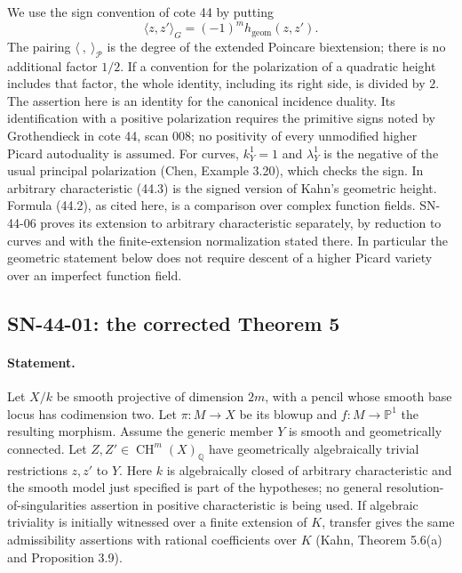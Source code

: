 \documentclass[11pt,a4paper]{article}
\theoremstyle{definition}
\theoremstyle{remark}
\begin{document}
We use the sign convention of cote 44 by putting
\[
 \langle z,z'\rangle_G=(-1)^m h_{\mathrm{geom}}(z,z').
 \tag{44.3}\label{eq:44-signed-height}
\]
The pairing $\langle\ ,\ \rangle_{\mathcal P}$ is the degree of the
extended Poincare biextension; there is no additional factor $1/2$.
If a convention for the polarization of a quadratic height includes
that factor, the whole identity, including its right side, is divided
by $2$.  The assertion here is an identity for the canonical incidence
duality.  Its identification with a positive polarization requires the
primitive signs noted by Grothendieck in cote 44, scan 008; no
positivity of every unmodified higher Picard autoduality is assumed.
For curves, $k_Y^1=1$ and $\lambda_Y^1$ is the negative of the usual
principal polarization (Chen, Example 3.20), which checks the sign.
In arbitrary characteristic (44.3) is the signed version of Kahn's
geometric height.  Formula (44.2), as cited here, is a comparison
over complex function fields.  SN-44-06 proves its extension to
arbitrary characteristic separately, by reduction to curves and
with the finite-extension normalization stated there.  In particular
the geometric statement below does not require descent of a higher
Picard variety over an imperfect function field.

\subsection{SN-44-01: the corrected Theorem 5}
\label{sn:44-01}

\paragraph{Statement.}
Let $X/k$ be smooth projective of dimension $2m$, with a pencil
whose smooth base locus has codimension two.  Let
$\pi:M\to X$ be its blowup and $f:M\to\mathbb P^1$ the resulting
morphism.  Assume the generic member $Y$ is smooth and geometrically
connected.  Let $Z,Z'\in\operatorname{CH}^{m}(X)_{\mathbb Q}$ have
geometrically algebraically trivial restrictions $z,z'$ to $Y$.
Here $k$ is algebraically closed of arbitrary characteristic and the
smooth model just specified is part of the hypotheses; no general
resolution-of-singularities assertion in positive characteristic is
being used.  If algebraic triviality is initially witnessed over a
finite extension of $K$, transfer gives the same admissibility
assertions with rational coefficients over $K$ (Kahn, Theorem 5.6(a)
and Proposition 3.9).
\end{document}
